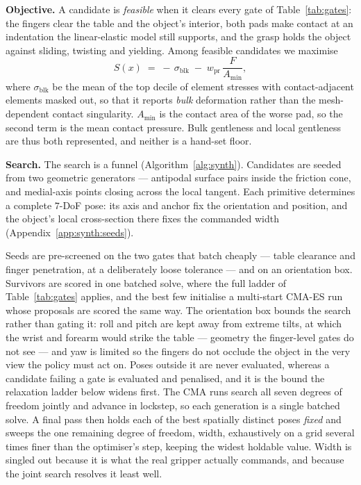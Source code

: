 \noindent\textbf{Objective.}
A candidate is \emph{feasible} when it clears every gate of Table~\ref{tab:gates}: the fingers
clear the table and the object's interior, both pads make contact at an indentation the
linear-elastic model still supports, and the grasp holds the object against sliding, twisting and
yielding. Among feasible candidates we maximise
\begin{equation}
  S(x) \;=\; -\,\sigma_{\mathrm{blk}} \;-\; w_{\mathrm{pr}}\,\frac{F}{A_{\min}},
  \label{eq:score}
\end{equation}
where $\sigma_{\mathrm{blk}}$ be the mean of the top decile of element stresses with contact-adjacent elements masked out, so that it reports
\emph{bulk} deformation rather than the mesh-dependent contact singularity.  $A_{\min}$ is the contact area of the worse pad, so the second term is the mean contact
pressure. 
Bulk gentleness and local gentleness are thus both represented, and neither is a hand-set floor.

\noindent\textbf{Search.}
The search is a funnel (Algorithm~\ref{alg:synth}). Candidates are seeded from two geometric
generators --- antipodal surface pairs inside the friction cone, and medial-axis points closing
across the local tangent. Each primitive determines a complete $7$-DoF pose: its axis and anchor
fix the orientation and position, and the object's local cross-section there fixes the commanded
width (Appendix~\ref{app:synth:seeds}).

Seeds are pre-screened on the two gates that batch cheaply --- table clearance and finger
penetration, at a deliberately loose tolerance --- and on an orientation box. Survivors are
scored in one batched solve, where the full ladder of Table~\ref{tab:gates} applies, and the
best few initialise a multi-start CMA-ES run whose proposals are scored the same way. The
orientation box bounds the search rather than gating it: roll and pitch are kept away from
extreme tilts, at which the wrist and forearm would strike the table --- geometry the
finger-level gates do not see --- and yaw is limited so the fingers do not occlude the object in
the very view the policy must act on. Poses outside it are never evaluated, whereas a candidate
failing a gate is evaluated and penalised, and it is the bound the relaxation ladder below
widens first. The CMA runs search all seven degrees of freedom jointly and advance in lockstep, so each
generation is a single batched solve. A final pass then holds each of the best spatially
distinct poses \emph{fixed} and sweeps the one remaining degree of freedom, width, exhaustively
on a grid several times finer than the optimiser's step, keeping the widest holdable
value. Width is singled out because it is what the real gripper actually commands, and because
the joint search resolves it least well.

